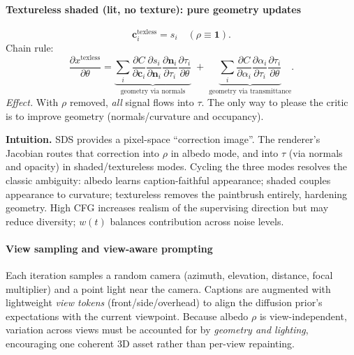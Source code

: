 \begin{enrichment}
\begin{enrichment}
        \paragraph{Textureless shaded (lit, no texture): pure geometry updates}
        \[
        \mathbf{c}_i^{\text{texless}}=s_i\quad(\rho\equiv\mathbf{1}).
        \]
        Chain rule:
        \[
        \frac{\partial x^{\text{texless}}}{\partial \theta}
        =\underbrace{\sum_i \frac{\partial C}{\partial \mathbf{c}_i}\frac{\partial s_i}{\partial \mathbf{n}_i}\frac{\partial \mathbf{n}_i}{\partial \tau_i}\frac{\partial \tau_i}{\partial \theta}}_{\text{geometry via normals}}
        \;+\;
        \underbrace{\sum_i \frac{\partial C}{\partial \alpha_i}\frac{\partial \alpha_i}{\partial \tau_i}\frac{\partial \tau_i}{\partial \theta}}_{\text{geometry via transmittance}}.
        \]
        \emph{Effect.} With \(\rho\) removed, \emph{all} signal flows into \(\tau\). The only way to please the critic is to improve geometry (normals/curvature and occupancy).
        
        \medskip
        \noindent
        \textbf{Intuition.}
        SDS provides a pixel-space “correction image”. The renderer’s Jacobian routes that correction into \(\rho\) in albedo mode, and into \(\tau\) (via normals and opacity) in shaded/textureless modes. Cycling the three modes resolves the classic ambiguity: albedo learns caption-faithful appearance; shaded couples appearance to curvature; textureless removes the paintbrush entirely, hardening geometry. High CFG increases realism of the supervising direction but may reduce diversity; \(w(t)\) balances contribution across noise levels.
        
        \paragraph{View sampling and view-aware prompting}
        \label{par:chapter23_dreamfusion_view_prompt}
        Each iteration samples a random camera (azimuth, elevation, distance, focal multiplier) and a point light near the camera. Captions are augmented with lightweight \emph{view tokens} (front/side/overhead) to align the diffusion prior’s expectations with the current viewpoint. Because albedo \(\rho\) is view-independent, variation across views must be accounted for by \emph{geometry and lighting}, encouraging one coherent 3D asset rather than per-view repainting.
        

\end{enrichment}
\end{enrichment}
